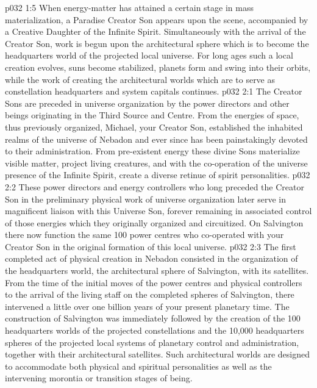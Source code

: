 \vs p032 1:5 \pc When energy\hyp{}matter has attained a certain stage in mass materialization, a Paradise Creator Son appears upon the scene, accompanied by a Creative Daughter of the Infinite Spirit. Simultaneously with the arrival of the Creator Son, work is begun upon the architectural sphere which is to become the headquarters world of the projected local universe. For long ages such a local creation evolves, suns become stabilized, planets form and swing into their orbits, while the work of creating the architectural worlds which are to serve as constellation headquarters and system capitals continues.
\vs p032 2:1 The Creator Sons are preceded in universe organization by the power directors and other beings originating in the Third Source and Centre. From the energies of space, thus previously organized, Michael, your Creator Son, established the inhabited realms of the universe of Nebadon and ever since has been painstakingly devoted to their administration. From pre\hyp{}existent energy these divine Sons materialize visible matter, project living creatures, and with the co\hyp{}operation of the universe presence of the Infinite Spirit, create a diverse retinue of spirit personalities.
\vs p032 2:2 These power directors and energy controllers who long preceded the Creator Son in the preliminary physical work of universe organization later serve in magnificent liaison with this Universe Son, forever remaining in associated control of those energies which they originally organized and circuitized. On Salvington there now function the same 100 power centres who co\hyp{}operated with your Creator Son in the original formation of this local universe.
\vs p032 2:3 \pc The first completed act of physical creation in Nebadon consisted in the organization of the headquarters world, the architectural sphere of Salvington, with its satellites. From the time of the initial moves of the power centres and physical controllers to the arrival of the living staff on the completed spheres of Salvington, there intervened a little over one billion years of your present planetary time. The construction of Salvington was immediately followed by the creation of the 100 headquarters worlds of the projected constellations and the 10,000 headquarters spheres of the projected local systems of planetary control and administration, together with their architectural satellites. Such architectural worlds are designed to accommodate both physical and spiritual personalities as well as the intervening morontia or transition stages of being.
